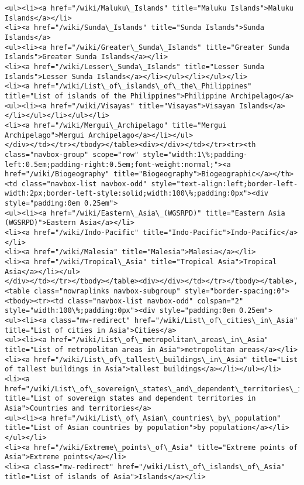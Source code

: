 \documentclass[11pt]{article}
\begin{document}
\begin{Verbatim}[commandchars=\\\{\}]
<ul><li><a href="/wiki/Maluku\_Islands" title="Maluku Islands">Maluku Islands</a></li>
<li><a href="/wiki/Sunda\_Islands" title="Sunda Islands">Sunda Islands</a>
<ul><li><a href="/wiki/Greater\_Sunda\_Islands" title="Greater Sunda Islands">Greater Sunda Islands</a></li>
<li><a href="/wiki/Lesser\_Sunda\_Islands" title="Lesser Sunda Islands">Lesser Sunda Islands</a></li></ul></li></ul></li>
<li><a href="/wiki/List\_of\_islands\_of\_the\_Philippines" title="List of islands of the Philippines">Philippine Archipelago</a>
<ul><li><a href="/wiki/Visayas" title="Visayas">Visayan Islands</a></li></ul></li></ul></li>
<li><a href="/wiki/Mergui\_Archipelago" title="Mergui Archipelago">Mergui Archipelago</a></li></ul>
</div></td></tr></tbody></table><div></div></td></tr><tr><th class="navbox-group" scope="row" style="width:1\%;padding-left:0.5em;padding-right:0.5em;font-weight:normal;"><a href="/wiki/Biogeography" title="Biogeography">Biogeographic</a></th><td class="navbox-list navbox-odd" style="text-align:left;border-left-width:2px;border-left-style:solid;width:100\%;padding:0px"><div style="padding:0em 0.25em">
<ul><li><a href="/wiki/Eastern\_Asia\_(WGSRPD)" title="Eastern Asia (WGSRPD)">Eastern Asia</a></li>
<li><a href="/wiki/Indo-Pacific" title="Indo-Pacific">Indo-Pacific</a></li>
<li><a href="/wiki/Malesia" title="Malesia">Malesia</a></li>
<li><a href="/wiki/Tropical\_Asia" title="Tropical Asia">Tropical Asia</a></li></ul>
</div></td></tr></tbody></table><div></div></td></tr></tbody></table>, <table class="nowraplinks navbox-subgroup" style="border-spacing:0"><tbody><tr><td class="navbox-list navbox-odd" colspan="2" style="width:100\%;padding:0px"><div style="padding:0em 0.25em">
<ul><li><a class="mw-redirect" href="/wiki/List\_of\_cities\_in\_Asia" title="List of cities in Asia">Cities</a>
<ul><li><a href="/wiki/List\_of\_metropolitan\_areas\_in\_Asia" title="List of metropolitan areas in Asia">metropolitan areas</a></li>
<li><a href="/wiki/List\_of\_tallest\_buildings\_in\_Asia" title="List of tallest buildings in Asia">tallest buildings</a></li></ul></li>
<li><a href="/wiki/List\_of\_sovereign\_states\_and\_dependent\_territories\_in\_Asia" title="List of sovereign states and dependent territories in Asia">Countries and territories</a>
<ul><li><a href="/wiki/List\_of\_Asian\_countries\_by\_population" title="List of Asian countries by population">by population</a></li></ul></li>
<li><a href="/wiki/Extreme\_points\_of\_Asia" title="Extreme points of Asia">Extreme points</a></li>
<li><a class="mw-redirect" href="/wiki/List\_of\_islands\_of\_Asia" title="List of islands of Asia">Islands</a></li>

\end{Verbatim}
\end{document}

